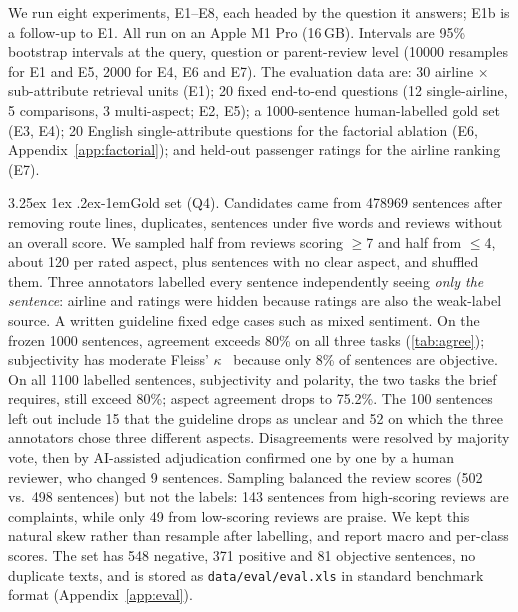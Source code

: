 \documentclass[10pt,twocolumn,a4paper]{article}
\makeatletter
\renewcommand\paragraph{\@startsection{paragraph}{4}{\parindent}%
  {3.25ex \@plus 1ex \@minus .2ex}{-1em}{\normalfont\normalsize\bfseries}}
\makeatother
\begin{document}
We run eight experiments, E1--E8, each headed by the question it answers; E1b is a follow-up to E1. All run on an
Apple M1 Pro (16\,GB). Intervals are 95\% bootstrap intervals at the query, question or parent-review level (\num{10000} resamples for E1 and
E5, \num{2000} for E4, E6 and E7). The evaluation data are: 30 airline $\times$ sub-attribute retrieval units
(E1); 20 fixed end-to-end questions (12 single-airline, 5 comparisons, 3 multi-aspect; E2, E5);
a \num{1000}-sentence human-labelled gold set (E3, E4); 20 English single-attribute questions for the factorial
ablation (E6, Appendix~\ref{app:factorial}); and held-out passenger ratings for the airline ranking (E7).

\paragraph{Gold set (Q4).} Candidates came from \num{478969} sentences after removing route lines, duplicates, sentences
under five words and reviews without an overall score. We sampled half from reviews scoring $\ge$7 and half from
$\le$4, about 120 per rated aspect, plus sentences with no clear aspect, and shuffled them. Three annotators labelled
every sentence independently seeing \emph{only the sentence}: airline and ratings were hidden because ratings are also
the weak-label source. A written guideline fixed edge cases such as mixed sentiment. On the frozen \num{1000} sentences, agreement exceeds
80\% on all three tasks (\cref{tab:agree}); subjectivity has moderate Fleiss' $\kappa$~\cite{fleiss} because only 8\% of
sentences are objective. On all \num{1100} labelled sentences, subjectivity and polarity, the two tasks the brief requires, still exceed 80\%;
aspect agreement drops to 75.2\%. The 100 sentences left out include 15 that the guideline drops as unclear and 52 on
which the three annotators chose three different aspects. Disagreements were resolved by majority vote, then by AI-assisted adjudication confirmed one by one by a
human reviewer, who changed 9 sentences. Sampling balanced the review scores (502 vs.\ 498 sentences) but not the labels: 143 sentences from high-scoring reviews
are complaints, while only 49 from low-scoring reviews are praise. We kept this natural skew rather than resample after
labelling, and report macro and per-class scores. The set has 548 negative, 371 positive and 81 objective sentences, no
duplicate texts, and is stored as \nolinkurl{data/eval/eval.xls} in standard benchmark format (Appendix~\ref{app:eval}).
\end{document}

